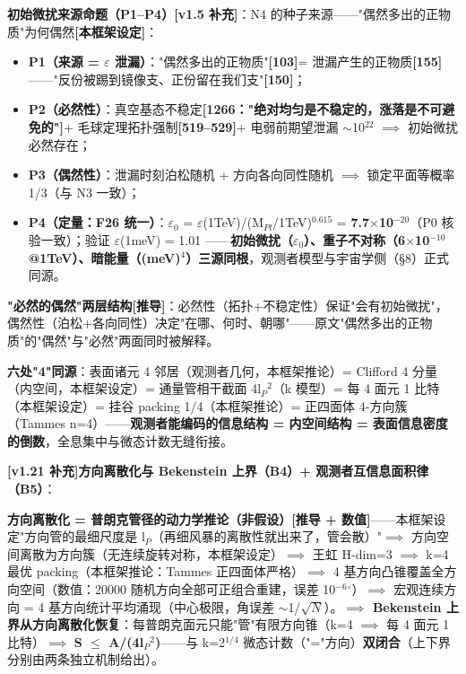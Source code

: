 \documentclass[UTF8,fontset=windows]{csoarticle}
\newcommand{\mtag}[1]{\textbf{[#1]}}
\newcommand{\up}[1]{\ensuremath{^{#1}}}
\newcommand{\down}[1]{\ensuremath{_{#1}}}
\begin{document}
\textbf{初始微扰来源命题（P1--P4）\mtag{v1.5 补充}}：N4 的种子来源------"偶然多出的正物质"为何偶然\mtag{本框架设定}：
\begin{itemize}
\item \textbf{P1（来源 = \ensuremath{\varepsilon} 泄漏）}："偶然多出的正物质"\mtag{103}= 泄漏产生的正物质\mtag{155}------"反份被踢到镜像支、正份留在我们支"\mtag{150}；
\item \textbf{P2（必然性）}：真空基态不稳定\mtag{1266："绝对均匀是不稳定的，涨落是不可避免的"}+ 毛球定理拓扑强制\mtag{519--529}+ 电弱前期望泄漏 \ensuremath{\sim}10\up{22} \ensuremath{\implies} 初始微扰必然存在；
\item \textbf{P3（偶然性）}：泄漏时刻泊松随机 + 方向各向同性随机 \ensuremath{\implies} 锁定平面等概率 1/3（与 N3 一致）；
\item \textbf{P4（定量：F26 统一）}：\ensuremath{\varepsilon}\down{0} = \ensuremath{\varepsilon}(1TeV)/(M\down{Pl}/1TeV)\up{0.615} = \textbf{7.7\ensuremath{\times}10\up{-20}}（P0 核验一致）；验证 \ensuremath{\varepsilon}(1meV) = 1.01 \checkmark------\textbf{初始微扰（\ensuremath{\varepsilon}\down{0}）、重子不对称（6\ensuremath{\times}10\up{-10} @1TeV）、暗能量（(meV)\up{4}）三源同根}，观测者模型与宇宙学侧（\S{}8）正式同源。
\end{itemize}

\textbf{"必然的偶然"两层结构\mtag{推导}}：必然性（拓扑+不稳定性）保证"会有初始微扰"，偶然性（泊松+各向同性）决定"在哪、何时、朝哪"------原文"偶然多出的正物质"的"偶然"与"必然"两面同时被解释。

\textbf{六处"4"同源}：表面诸元 4 邻居（观测者几何，本框架推论）= Clifford 4 分量（内空间，本框架设定）= 通量管相干截面 4l\down{P}\up{2}（k 模型）= 每 4 面元 1 比特（本框架设定）= 挂谷 packing 1/4（本框架推论）= 正四面体 4-方向簇（Tammes n=4）------\textbf{观测者能编码的信息结构 = 内空间结构 = 表面信息密度的倒数}，全息集中与微态计数无缝衔接。

\textbf{\mtag{v1.21 补充}方向离散化与 Bekenstein 上界（B4）+ 观测者互信息面积律（B5）}：

\textbf{方向离散化 = 普朗克管径的动力学推论（非假设）}\mtag{推导 + 数值}------本框架设定"方向管的最细尺度是 l\down{P}（再细风暴的离散性就出来了，管会散）"\ensuremath{\implies} 方向空间离散为方向簇（无连续旋转对称，本框架设定）\ensuremath{\implies} 王虹 H-dim=3 \ensuremath{\implies} k=4 最优 packing（本框架推论：Tammes 正四面体严格）\ensuremath{\implies} 4 基方向凸锥覆盖全方向空间（数值：20000 随机方向全部可正组合重建，误差 10\up{-6}\ensuremath{^{\circ}}）\ensuremath{\implies} 宏观连续方向 = 4 基方向统计平均涌现（中心极限，角误差 \ensuremath{\sim}1/\ensuremath{\sqrt{N}}）。\textbf{\ensuremath{\implies} Bekenstein 上界从方向离散化恢复}：每普朗克面元只能"管"有限方向锥（k=4 \ensuremath{\implies} 每 4 面元 1 比特）\ensuremath{\implies} \textbf{S \ensuremath{\leq} A/(4l\down{P}\up{2})}------与 k=2\up{1/4} 微态计数（"="方向）\textbf{双闭合}（上下界分别由两条独立机制给出）。
\end{document}
